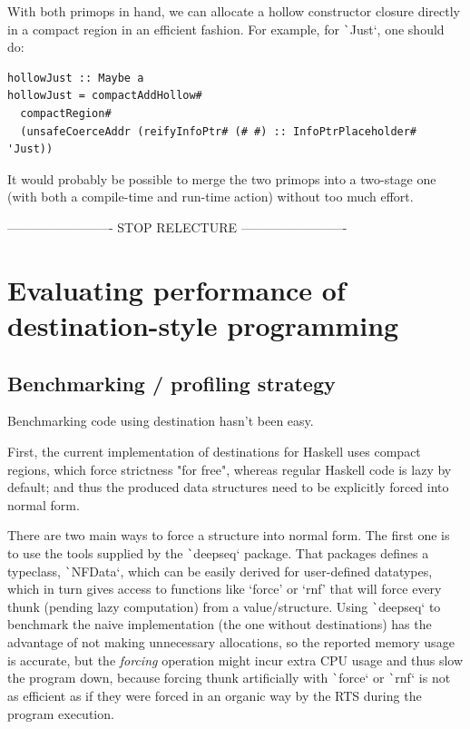 \documentclass[english]{jflart}
\newcommand{\TODO}[1]{{\color{red}\large #1}}
\begin{document}
With both primops in hand, we can allocate a hollow constructor closure directly in a compact region in an efficient fashion. For example, for \texttt`Just`, one should do:
{\small
\begin{verbatim}
hollowJust :: Maybe a
hollowJust = compactAddHollow#
  compactRegion#
  (unsafeCoerceAddr (reifyInfoPtr# (# #) :: InfoPtrPlaceholder# 'Just))  
\end{verbatim}
}

It would probably be possible to merge the two primops into a two-stage one (with both a compile-time and run-time action) without too much effort.

\clearpage{}
\TODO{------------------------- STOP RELECTURE -------------------------}

\section{Evaluating performance of destination-style programming}

\subsection{Benchmarking / profiling strategy}

Benchmarking code using destination hasn't been easy.

First, the current implementation of destinations for Haskell uses compact regions, which force strictness "for free", whereas regular Haskell code is lazy by default; and thus the produced data structures need to be explicitly forced into normal form.

There are two main ways to force a structure into normal form. The first one is to use the tools supplied by the \texttt`deepseq` package. That packages defines a typeclass, \texttt`NFData`, which can be easily derived for user-defined datatypes, which in turn gives access to functions like `force' or `rnf' that will force every thunk (pending lazy computation) from a value/structure. Using \texttt`deepseq` to benchmark the naive implementation (the one without destinations) has the advantage of not making unnecessary allocations, so the reported memory usage is accurate, but the \emph{forcing} operation might incur extra CPU usage and thus slow the program down, because forcing thunk artificially with \texttt`force` or \texttt`rnf` is not as efficient as if they were forced in an organic way by the RTS during the program execution.
\end{document}
